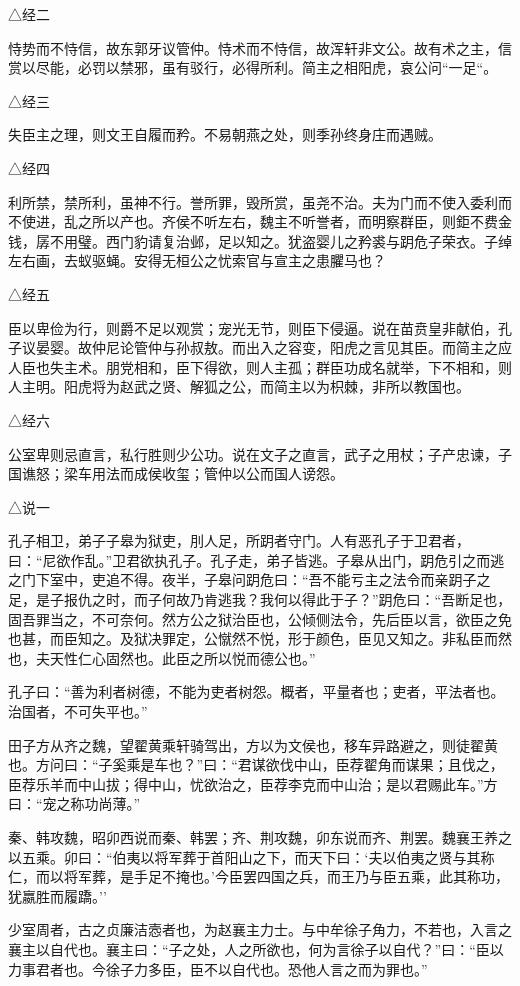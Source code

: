 \documentclass[]{article}
\begin{document}
△经二

恃势而不恃信，故东郭牙议管仲。恃术而不恃信，故浑轩非文公。故有术之主，信赏以尽能，必罚以禁邪，虽有驳行，必得所利。简主之相阳虎，哀公问``一足``。

△经三

失臣主之理，则文王自履而矜。不易朝燕之处，则季孙终身庄而遇贼。

△经四

利所禁，禁所利，虽神不行。誉所罪，毁所赏，虽尧不治。夫为门而不使入委利而不使进，乱之所以产也。齐侯不听左右，魏主不听誉者，而明察群臣，则鉅不费金钱，孱不用璧。西门豹请复治邺，足以知之。犹盗婴儿之矜裘与跀危子荣衣。子绰左右画，去蚁驱蝇。安得无桓公之忧索官与宣主之患臞马也？

△经五

臣以卑俭为行，则爵不足以观赏；宠光无节，则臣下侵逼。说在苗贲皇非献伯，孔子议晏婴。故仲尼论管仲与孙叔敖。而出入之容变，阳虎之言见其臣。而简主之应人臣也失主术。朋党相和，臣下得欲，则人主孤；群臣功成名就举，下不相和，则人主明。阳虎将为赵武之贤、解狐之公，而简主以为枳棘，非所以教国也。

△经六

公室卑则忌直言，私行胜则少公功。说在文子之直言，武子之用杖；子产忠谏，子国谯怒；梁车用法而成侯收玺；管仲以公而国人谤怨。

△说一

孔子相卫，弟子子皋为狱吏，刖人足，所跀者守门。人有恶孔子于卫君者，曰：``尼欲作乱。''卫君欲执孔子。孔子走，弟子皆逃。子皋从出门，跀危引之而逃之门下室中，吏追不得。夜半，子皋问跀危曰：``吾不能亏主之法令而亲跀子之足，是子报仇之时，而子何故乃肯逃我？我何以得此于子？''跀危曰：``吾断足也，固吾罪当之，不可奈何。然方公之狱治臣也，公倾侧法令，先后臣以言，欲臣之免也甚，而臣知之。及狱决罪定，公憱然不悦，形于颜色，臣见又知之。非私臣而然也，夫天性仁心固然也。此臣之所以悦而德公也。''

孔子曰：``善为利者树德，不能为吏者树怨。概者，平量者也；吏者，平法者也。治国者，不可失平也。''

田子方从齐之魏，望翟黄乘轩骑驾出，方以为文侯也，移车异路避之，则徒翟黄也。方问曰：``子奚乘是车也？''曰：``君谋欲伐中山，臣荐翟角而谋果；且伐之，臣荐乐羊而中山拔；得中山，忧欲治之，臣荐李克而中山治；是以君赐此车。''方曰：``宠之称功尚薄。''

秦、韩攻魏，昭卯西说而秦、韩罢；齐、荆攻魏，卯东说而齐、荆罢。魏襄王养之以五乘。卯曰：``伯夷以将军葬于首阳山之下，而天下曰：`夫以伯夷之贤与其称仁，而以将军葬，是手足不掩也。'今臣罢四国之兵，而王乃与臣五乘，此其称功，犹嬴胜而履蹻。''

少室周者，古之贞廉洁悫者也，为赵襄主力士。与中牟徐子角力，不若也，入言之襄主以自代也。襄主曰：``子之处，人之所欲也，何为言徐子以自代？''曰：``臣以力事君者也。今徐子力多臣，臣不以自代也。恐他人言之而为罪也。''
\end{document}
